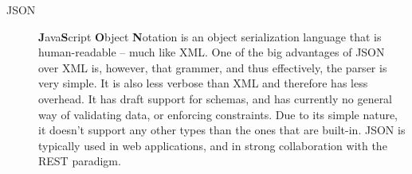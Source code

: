 \begin{description}
\item[JSON] \textbf{J}ava\textbf{S}cript \textbf{O}bject \textbf{N}otation is an object serialization language that is human-readable -- much like XML. One of the big advantages of JSON over XML is, however, that grammer, and thus effectively, the parser is very simple. It is also less verbose than XML and therefore has less overhead. It has draft support for schemas, and has currently no general way of validating data, or enforcing constraints. Due to its simple nature, it doesn't support any other types than the ones that are built-in. JSON is typically used in web applications, and in strong collaboration with the REST paradigm.

\end{description}